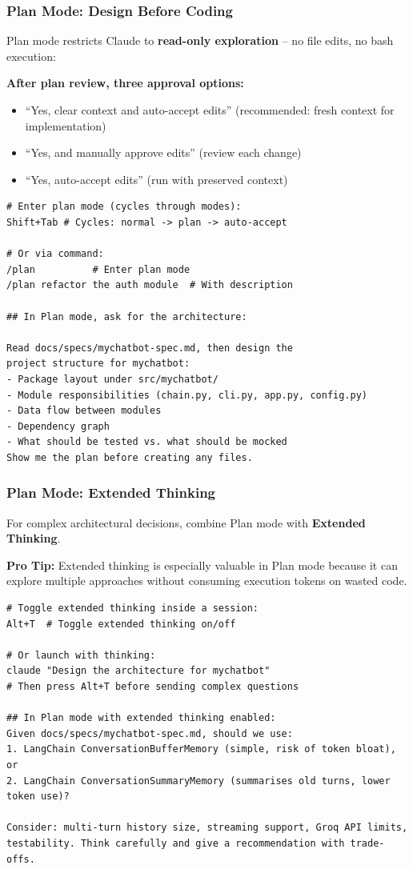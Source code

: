 \begin{frame}[fragile]\frametitle{Plan Mode: Design Before Coding}
Plan mode restricts Claude to \textbf{read-only exploration} -- no file edits, no bash execution:

\textbf{After plan review, three approval options:}
  \begin{itemize}
    \item ``Yes, clear context and auto-accept edits'' (recommended: fresh context for implementation)
    \item ``Yes, and manually approve edits'' (review each change)
    \item ``Yes, auto-accept edits'' (run with preserved context)
  \end{itemize}
  
\begin{lstlisting}
# Enter plan mode (cycles through modes):
Shift+Tab # Cycles: normal -> plan -> auto-accept

# Or via command:
/plan          # Enter plan mode
/plan refactor the auth module  # With description

## In Plan mode, ask for the architecture:

Read docs/specs/mychatbot-spec.md, then design the
project structure for mychatbot:
- Package layout under src/mychatbot/
- Module responsibilities (chain.py, cli.py, app.py, config.py)
- Data flow between modules
- Dependency graph
- What should be tested vs. what should be mocked
Show me the plan before creating any files.
\end{lstlisting}


\end{frame}


\begin{frame}[fragile]\frametitle{Plan Mode: Extended Thinking}
For complex architectural decisions, combine Plan mode with \textbf{Extended Thinking}.

\textbf{Pro Tip:} Extended thinking is especially valuable in Plan mode because it can explore multiple approaches without consuming execution tokens on wasted code.

\begin{lstlisting}
# Toggle extended thinking inside a session:
Alt+T  # Toggle extended thinking on/off

# Or launch with thinking:
claude "Design the architecture for mychatbot"
# Then press Alt+T before sending complex questions

## In Plan mode with extended thinking enabled:
Given docs/specs/mychatbot-spec.md, should we use:
1. LangChain ConversationBufferMemory (simple, risk of token bloat), or
2. LangChain ConversationSummaryMemory (summarises old turns, lower token use)?

Consider: multi-turn history size, streaming support, Groq API limits, testability. Think carefully and give a recommendation with trade-offs.
\end{lstlisting}

\end{frame}


